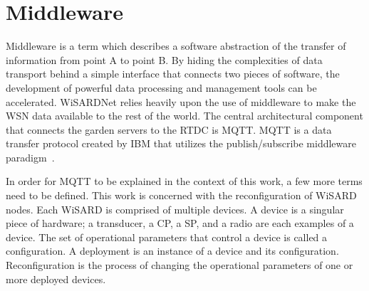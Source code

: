\section{Middleware}


Middleware is a term which describes a software abstraction of the transfer of information from point A to  point B. By hiding the complexities of data transport behind a simple interface that connects two pieces of software, the development of powerful data processing and management tools can be accelerated. WiSARDNet relies heavily upon the use of middleware to make the WSN data available to the rest of the world. The central architectural component that connects the garden servers to the RTDC is MQTT. MQTT is a data transfer protocol created by IBM that utilizes the publish/subscribe middleware paradigm~\cite{HunTruSta08}.

In order for MQTT to be explained in the context of this work, a few more terms need to be defined. This work is concerned with the reconfiguration of WiSARD nodes. Each WiSARD is comprised of multiple devices. A device is a singular piece of hardware; a transducer, a CP, a SP, and a radio are each examples  of a device. The set of operational parameters that control a device is called a configuration. A deployment is an instance of a device and its configuration. Reconfiguration is the process of changing the operational parameters of one or more deployed devices.

